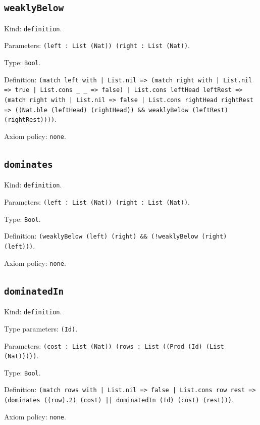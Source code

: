 \documentclass[11pt]{article}
\begin{document}
\subsection*{\texttt{weaklyBelow}}
\noindent Kind: \texttt{definition}.\par
\noindent Parameters: \texttt{(left : List (Nat)) (right : List (Nat))}.\par
\noindent Type: \texttt{Bool}.\par
\noindent Definition: \texttt{(match left with | List.nil => (match right with | List.nil => true | List.cons \_ \_ => false) | List.cons leftHead leftRest => (match right with | List.nil => false | List.cons rightHead rightRest => ((Nat.ble (leftHead) (rightHead)) \&\& weaklyBelow (leftRest) (rightRest))))}.\par
\noindent Axiom policy: \texttt{none}.\par
\subsection*{\texttt{dominates}}
\noindent Kind: \texttt{definition}.\par
\noindent Parameters: \texttt{(left : List (Nat)) (right : List (Nat))}.\par
\noindent Type: \texttt{Bool}.\par
\noindent Definition: \texttt{(weaklyBelow (left) (right) \&\& (!weaklyBelow (right) (left)))}.\par
\noindent Axiom policy: \texttt{none}.\par
\subsection*{\texttt{dominatedIn}}
\noindent Kind: \texttt{definition}.\par
\noindent Type parameters: \texttt{(Id)}.\par
\noindent Parameters: \texttt{(cost : List (Nat)) (rows : List ((Prod (Id) (List (Nat)))))}.\par
\noindent Type: \texttt{Bool}.\par
\noindent Definition: \texttt{(match rows with | List.nil => false | List.cons row rest => (dominates ((row).2) (cost) || dominatedIn (Id) (cost) (rest)))}.\par
\noindent Axiom policy: \texttt{none}.\par
\end{document}
